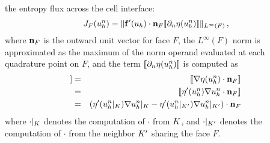 the entropy flux across the cell interface:
\begin{equation}
  J_F(u_h^n)
  = \|\mathbf{f}'(u_h)\cdot\mathbf{n}_F
  [\![\partial_n \eta(u_h^n)
  ]\!]\|_{L^\infty(F)} \,,
\end{equation}
where $\mathbf{n}_F$ is the outward unit vector for face $F$, the
$L^\infty(F)$ norm is approximated as the maximum of the norm operand evaluated
at each quadrature point on $F$, and the term $[\![\partial_n \eta(
u_h^n)]\!]$ is computed as
\begin{eqnarray}
  [\![\partial_n \entropy(\approximatescalarsolution^\timeindex)]\!]
  & = & [\![\nabla\entropy(\approximatescalarsolution^\timeindex)
    \cdot\normalvector_F]\!]\\
  & = & [\![\entropy'(\approximatescalarsolution^\timeindex)
    \nabla\approximatescalarsolution^\timeindex\cdot\normalvector_F]\!]\\
  & = & (\entropy'(\approximatescalarsolution^\timeindex
    |_\cellindex)\nabla\approximatescalarsolution^\timeindex|_\cellindex
    - \entropy'(\approximatescalarsolution^\timeindex
    |_{\cellindex'})\nabla\approximatescalarsolution^\timeindex|_{\cellindex'})
    \cdot\normalvector_F
\end{eqnarray}
where $\cdot|_K$ denotes the computation of $\cdot$ from $K$,
and $\cdot|_{K'}$ denotes the computation of $\cdot$ from the neighbor
$K'$ sharing the face $F$.
